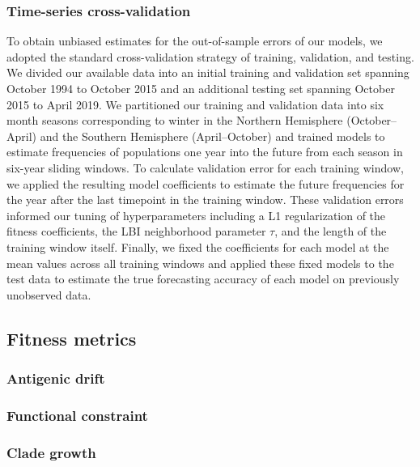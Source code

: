 \subsubsection*{Time-series cross-validation}

To obtain unbiased estimates for the out-of-sample errors of our models, we adopted the standard cross-validation strategy of training, validation, and testing.
We divided our available data into an initial training and validation set spanning October 1994 to October 2015 and an additional testing set spanning October 2015 to April 2019.
We partitioned our training and validation data into six month seasons corresponding to winter in the Northern Hemisphere (October--April) and the Southern Hemisphere (April--October) and trained models to estimate frequencies of populations one year into the future from each season in six-year sliding windows.
To calculate validation error for each training window, we applied the resulting model coefficients to estimate the future frequencies for the year after the last timepoint in the training window.
These validation errors informed our tuning of hyperparameters including a L1 regularization of the fitness coefficients, the LBI neighborhood parameter $\tau$, and the length of the training window itself.
Finally, we fixed the coefficients for each model at the mean values across all training windows and applied these fixed models to the test data to estimate the true forecasting accuracy of each model on previously unobserved data.

\subsection*{Fitness metrics}

\subsubsection*{Antigenic drift}

\subsubsection*{Functional constraint}

\subsubsection*{Clade growth}
